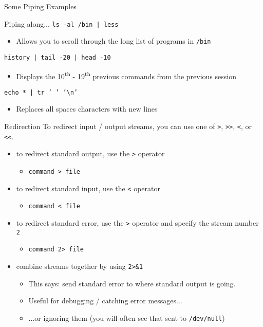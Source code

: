 \documentclass[11pt]{beamer}
\newcommand{\tsup}{\textsuperscript}                        %
\begin{document}
\begin{frame}[fragile]{Some Piping Examples}
  \begin{block}{Piping along...}
    \texttt{ls -al /bin | less}
    \begin{itemize}
      \item Allows you to scroll through the long list of programs in \texttt{/bin}
    \end{itemize}
    \texttt{history | tail -20 | head -10}
    \begin{itemize}
      \item Displays the 10\tsup{th} \-- 19\tsup{th} previous commands from the previous session
    \end{itemize}
    \texttt{echo * | tr ' ' '\textbackslash n'}
    \begin{itemize}
      \item Replaces all spaces characters with new lines
    \end{itemize}
  \end{block}
\end{frame}

\begin{frame}[fragile]{Redirection}
  To redirect input / output streams, you can use one of \texttt{>}, \texttt{>>}, \texttt{<}, or \texttt{<<}.
  \begin{itemize}[<+- | alert@+>]
    \item to redirect standard output, use the \texttt{>} operator
    \begin{itemize}[<+- | alert@+>]
      \item \texttt{command > file}
    \end{itemize}
    \item to redirect standard input, use the \texttt{<} operator
    \begin{itemize}[<+- | alert@+>]
      \item \texttt{command < file}
    \end{itemize}
    \item to redirect standard error, use the \texttt{>} operator and specify the stream number \texttt{2}
    \begin{itemize}[<+- | alert@+>]
      \item \texttt{command 2> file}
    \end{itemize}
    \item combine streams together by using \texttt{2>\&1}
    \begin{itemize}
      \item This says: send standard error to where standard output is going.
      \item Useful for debugging / catching error messages...
      \item ...or ignoring them (you will often see that sent to \texttt{/dev/null})
    \end{itemize}
  \end{itemize}
\end{frame}
\end{document}
